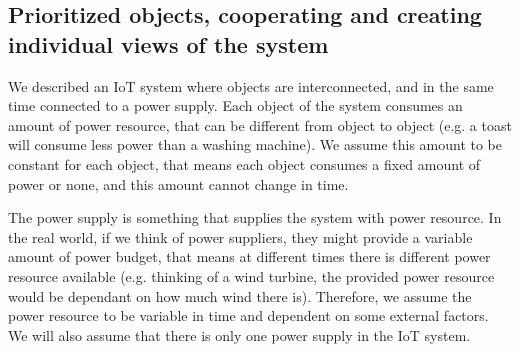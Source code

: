 \documentclass[../main/IoT.tex]{subfiles}
\begin{document}
\subsection{Prioritized objects, cooperating and creating individual views of the system}
We described an IoT system where objects are interconnected, and in the same time connected to a power supply. Each object of the system consumes an amount of power resource, that can be different from object to object (e.g. a toast will consume less power than a washing machine). We assume this amount to be constant for each object, that means each object consumes a fixed amount of power or none, and this amount cannot change in time.

The power supply is something that supplies the system with power resource. In the real world, if we think of power suppliers, they might provide a variable amount of power budget, that means at different times there is different power resource available (e.g. thinking of a wind turbine, the provided power resource would be dependant on how much wind there is). Therefore, we assume the power resource to be variable in time and dependent on some external factors. We will also assume that there is only one power supply in the IoT system.
\end{document}
